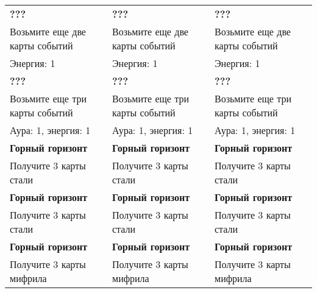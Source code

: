 \documentclass[a4paper,12pt]{article}
\begin{document}
  \begin{tabular}{|p{5cm}|p{5cm}|p{5cm}|}
    \hline
      \textbf{???} & \textbf{???} & \textbf{???} \\
      Возьмите еще две карты событий & Возьмите еще две карты событий & Возьмите еще две карты событий \\
      Энергия: 1 & Энергия: 1 & Энергия: 1 \\

    \hline
      \textbf{???} & \textbf{???} & \textbf{???} \\
      Возьмите еще три карты событий & Возьмите еще три карты событий & Возьмите еще три карты событий \\
      Аура: 1, энергия: 1 & Аура: 1, энергия: 1 & Аура: 1, энергия: 1 \\

    \hline
      \textbf{Горный горизонт} & \textbf{Горный горизонт} & \textbf{Горный горизонт} \\
      Получите 3 карты стали & Получите 3 карты стали & Получите 3 карты стали \\

    \hline
      \textbf{Горный горизонт} & \textbf{Горный горизонт} & \textbf{Горный горизонт} \\
      Получите 3 карты стали & Получите 3 карты стали & Получите 3 карты стали \\

    \hline
      \textbf{Горный горизонт} & \textbf{Горный горизонт} & \textbf{Горный горизонт} \\
      Получите 3 карты мифрила & Получите 3 карты мифрила & Получите 3 карты мифрила \\
    \hline
  \end{tabular}
  \newpage
\end{document}
